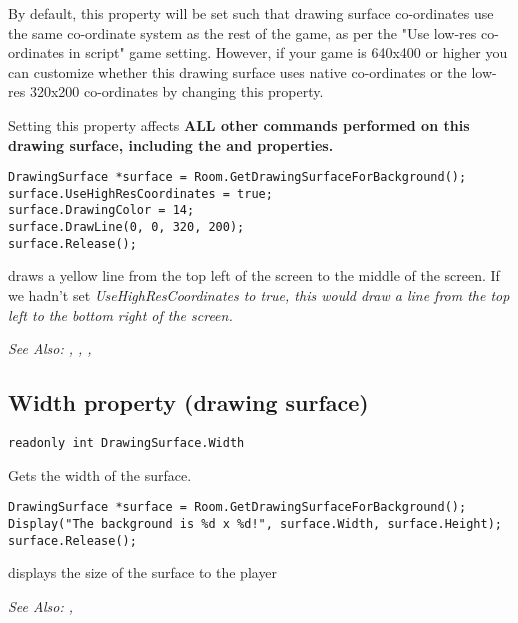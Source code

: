 By default, this property will be set such that drawing surface co-ordinates use the same
co-ordinate system as the rest of the game, as per the "Use low-res co-ordinates in script"
game setting. However, if your game is 640x400 or higher you can customize whether
this drawing surface uses native co-ordinates or the low-res 320x200 co-ordinates by
changing this property.

Setting this property affects \bf{ALL} other commands performed on this drawing
surface, including the  and 
properties.

\begin{verbatim}
DrawingSurface *surface = Room.GetDrawingSurfaceForBackground();
surface.UseHighResCoordinates = true;
surface.DrawingColor = 14;
surface.DrawLine(0, 0, 320, 200);
surface.Release();
\end{verbatim}
draws a yellow line from the top left of the screen to the middle of the screen. If we
hadn't set \it{UseHighResCoordinates} to true, this would draw a line from the top left
to the bottom right of the screen.

\it{See Also:} , ,
,


\subsection{Width property (drawing surface)}\label{DrawingSurface.Width}%

\begin{verbatim}
readonly int DrawingSurface.Width
\end{verbatim}
Gets the width of the surface.

\begin{verbatim}
DrawingSurface *surface = Room.GetDrawingSurfaceForBackground();
Display("The background is %d x %d!", surface.Width, surface.Height);
surface.Release();
\end{verbatim}
displays the size of the surface to the player

\it{See Also:} ,



